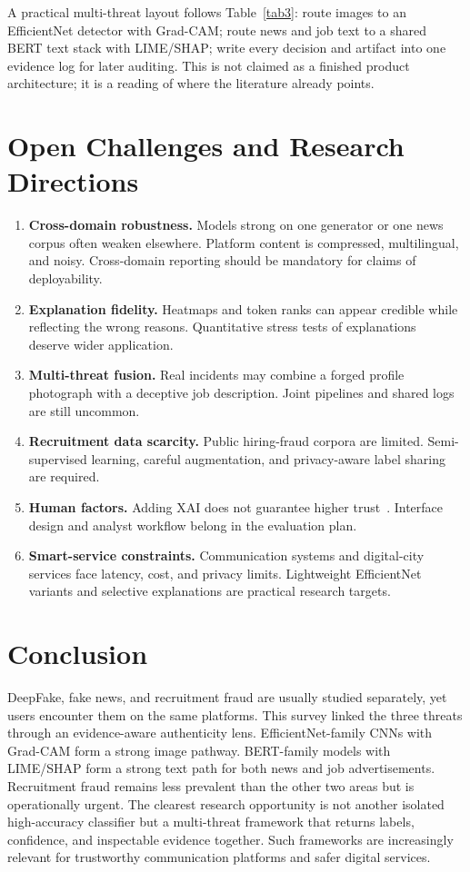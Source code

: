 \documentclass[runningheads]{llncs}
\begin{document}
\noindent A practical multi-threat layout follows Table~\ref{tab3}: route images to an EfficientNet detector with Grad-CAM; route news and job text to a shared BERT text stack with LIME/SHAP; write every decision and artifact into one evidence log for later auditing. This is not claimed as a finished product architecture; it is a reading of where the literature already points.

\section{Open Challenges and Research Directions}
\label{sec:open}
\begin{enumerate}
\item \textbf{Cross-domain robustness.} Models strong on one generator or one news corpus often weaken elsewhere. Platform content is compressed, multilingual, and noisy. Cross-domain reporting should be mandatory for claims of deployability.
\item \textbf{Explanation fidelity.} Heatmaps and token ranks can appear credible while reflecting the wrong reasons. Quantitative stress tests of explanations~\cite{r19} deserve wider application.
\item \textbf{Multi-threat fusion.} Real incidents may combine a forged profile photograph with a deceptive job description. Joint pipelines and shared logs are still uncommon.
\item \textbf{Recruitment data scarcity.} Public hiring-fraud corpora are limited. Semi-supervised learning, careful augmentation, and privacy-aware label sharing are required.
\item \textbf{Human factors.} Adding XAI does not guarantee higher trust~\cite{r29}. Interface design and analyst workflow belong in the evaluation plan.
\item \textbf{Smart-service constraints.} Communication systems and digital-city services face latency, cost, and privacy limits. Lightweight EfficientNet variants and selective explanations are practical research targets.
\end{enumerate}

\section{Conclusion}
\label{sec:concl}
DeepFake, fake news, and recruitment fraud are usually studied separately, yet users encounter them on the same platforms. This survey linked the three threats through an evidence-aware authenticity lens. EfficientNet-family CNNs with Grad-CAM form a strong image pathway. BERT-family models with LIME/SHAP form a strong text path for both news and job advertisements. Recruitment fraud remains less prevalent than the other two areas but is operationally urgent. The clearest research opportunity is not another isolated high-accuracy classifier but a multi-threat framework that returns labels, confidence, and inspectable evidence together. Such frameworks are increasingly relevant for trustworthy communication platforms and safer digital services.
\end{document}
